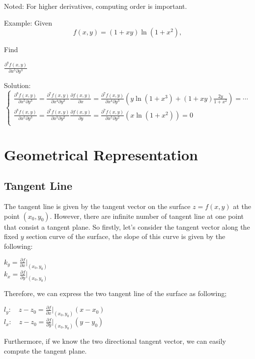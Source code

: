 Noted: For higher derivatives, computing order is important.

Example: Given
\[f(x,y)=(1+xy)\ln (1+x^2),\]

Find
\begin{center}
$\frac{\partial^{8}f(x,y)}{\partial x^5 \partial y^3}$
\end{center}

Solution:
\[\begin{cases}
\frac{\partial^{8}f(x,y)}{\partial x^5 \partial y^3}=\frac{\partial^{7}f(x,y)}{\partial x^4 \partial y^3}\frac{\partial f(x,y)}{\partial x}=\frac{\partial^{7}f(x,y)}{\partial x^4 \partial y^3}(y\ln (1+x^3)+(1+xy)\frac{2y}{1+x^2})=\cdots \\
\frac{\partial^{8}f(x,y)}{\partial x^5 \partial y^3}=\frac{\partial^{7}f(x,y)}{\partial x^5 \partial y^2}\frac{\partial f(x,y)}{\partial y}=\frac{\partial^{7}f(x,y)}{\partial x^5 \partial y^2}(x\ln (1+x^2))=0 \\
\end{cases}\]

\section{Geometrical Representation}
\subsection{Tangent Line}
The tangent line is given by the tangent vector on the surface $z=f(x,y)$ at the point $(x_0,y_0)$. However, there are infinite number of tangent line at one point that consist a tangent plane. So firstly, let's consider the tangent vector along the fixed $y$ section curve of the surface, the slope of this curve is given by the following:

\begin{center}
$k_y=\frac{\partial f}{\partial x}|_{(x_0,y_0)}$\\
$k_x=\frac{\partial f}{\partial y}|_{(x_0,y_0)}$
\end{center}

Therefore, we can express the two tangent line of the surface as following;

\begin{center}
$l_{y}: \quad z-z_0=\frac{\partial f}{\partial x}|_{(x_0,y_0)}(x-x_0)$\\
$l_{x}: \quad z-z_0=\frac{\partial f}{\partial y}|_{(x_0,y_0)}(y-y_0)$
\end{center}

Furthermore, if we know the two directional tangent vector, we can easily compute the tangent plane.
